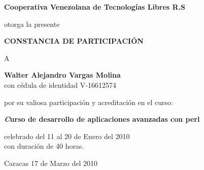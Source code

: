 \documentclass[letterpaper,oneside,spanish]{scrbook}
\begin{document}
\begin{center}

{\fontsize{15}{15}\bfseries Cooperativa Venezolana de Tecnologías Libres R.S }

\vspace{1cm}

otorga la presente 

\vspace{0.3cm}

{\fontsize{20}{20}\bfseries CONSTANCIA DE PARTICIPACIÓN }
\vspace{1cm}

A

\vspace{1cm}

{\fontsize{20}{30}\bfseries Walter Alejandro Vargas Molina}\\
\vspace{0.5cm}
{con cédula de identidad V-16612574}

\vspace{1cm}

por su valiosa participación y acreditación en el curso: 

\vspace{0.3cm}

{\fontsize{20}{20}\bfseries\emph Curso de desarrollo de aplicaciones avanzadas con perl}

\vspace{0.3cm}

celebrado del 11 al 20 de Enero del 2010 \\
con duración de 40 horas.\\ 

\vspace{1cm}

Caracas 17 de Marzo del 2010


\end{center}
\end{document}
